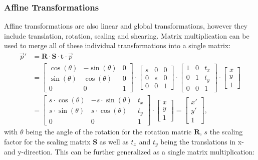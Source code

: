 \documentclass[english,version-2022-01]{uzl-thesis} %
\begin{document}
\subsubsection{Affine Transformations}
Affine transformations are also linear and global transformations, however they include translation, rotation, scaling and shearing. Matrix multiplication can be used to merge all of these individual transformations into a single matrix:
\begin{align}
	\overrightarrow{p}' 	&= \mathbf{R} \cdot \mathbf{S} \cdot \mathbf{t} \cdot  \overrightarrow{p}	\\
	&= 
	\begin{bmatrix}
		\cos(\theta) & -\sin(\theta) & 0\\
		\sin(\theta) & \cos(\theta) & 0\\
		0 & 0 & 1
	\end{bmatrix}
	\cdot 
	\begin{bmatrix}
		s & 0 & 0\\
		0 & s & 0\\
		0 & 0 & 1
	\end{bmatrix}
	\cdot 
	\begin{bmatrix}
		1 & 0 & t_x\\
		0 & 1 & t_y\\
		0 & 0 & 1
	\end{bmatrix}
	\cdot
	\begin{bmatrix}
		x\\
		y\\
		1
	\end{bmatrix}
	\\
	&=
	\begin{bmatrix}
		s \cdot \cos(\theta) & -s \cdot \sin(\theta) & t_x\\
		s \cdot \sin(\theta) & s \cdot \cos(\theta) & t_y\\
		0 & 0 & 1
	\end{bmatrix}
	\cdot
	\begin{bmatrix}
		x\\
		y\\
		1
	\end{bmatrix} =
	\begin{bmatrix}
		x'\\
		y'\\
		1
	\end{bmatrix} ,
\end{align}
with $\theta$ being the angle of the rotation for the rotation matric $\mathbf{R}$, $s$ the scaling factor for the scaling matrix $\mathbf{S}$ as well as $t_x$ and $t_y$ being the translations in x- and y-direction. This can be further generalized as a single matrix multiplication:
\end{document}
